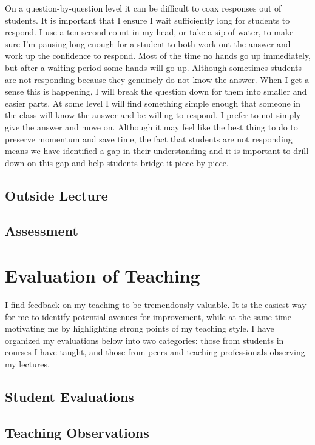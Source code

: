 \documentclass{article}
\begin{document}
On a question-by-question level it can be difficult to coax responses out of students. It is important that I ensure I wait sufficiently long for students to respond. I use a ten second count in my head, or take a sip of water, to make sure I'm pausing long enough for a student to both work out the answer and work up the confidence to respond. Most of the time no hands go up immediately, but after a waiting period some hands will go up. Although sometimes students are not responding because they genuinely do not know the answer. When I get a sense this is happening, I will break the question down for them into smaller and easier parts. At some level I will find something simple enough that someone in the class will know the answer and be willing to respond. I prefer to not simply give the answer and move on. Although it may feel like the best thing to do to preserve momentum and save time, the fact that students are not responding means we have identified a gap in their understanding and it is important to drill down on this gap and help students bridge it piece by piece.
\subsection{Outside Lecture}

\subsection{Assessment}
\section{Evaluation of Teaching}
I find feedback on my teaching to be tremendously valuable. It is the easiest way for me to identify potential avenues for improvement, while at the same time motivating me by highlighting strong points of my teaching style. I have organized my evaluations below into two categories: those from students in courses I have taught, and those from peers and teaching professionals observing my lectures.
\subsection{Student Evaluations}
\subsection{Teaching Observations}
\end{document}

